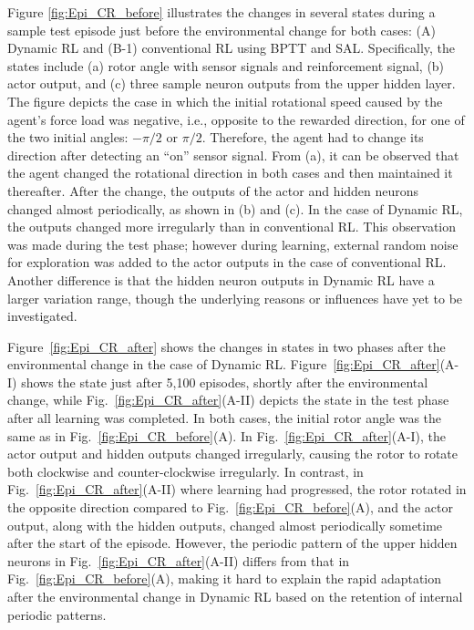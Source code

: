 Figure \ref{fig:Epi_CR_before} illustrates the changes in several states during a sample test episode just before the environmental change
for both cases: (A) Dynamic RL and (B-1) conventional RL using BPTT and SAL.
Specifically, the states include (a) rotor angle with sensor signals and reinforcement signal, (b) actor output,
and (c) three sample neuron outputs from the upper hidden layer.
The figure depicts the case in which the initial rotational speed caused by the agent's force load was negative,
i.e., opposite to the rewarded direction, for one of the two initial angles: $-\pi/2$ or $\pi/2$.
Therefore, the agent had to change its direction after detecting an ``on'' sensor signal.
From (a), it can be observed that the agent changed the rotational direction in both cases
and then maintained it thereafter.
After the change, the outputs of the actor and hidden neurons changed almost periodically, as shown in (b) and (c).
In the case of Dynamic RL, the outputs changed more irregularly than in conventional RL.
This observation was made during the test phase; however during learning,
external random noise for exploration was added
to the actor outputs in the case of conventional RL.
Another difference is that the hidden neuron outputs in Dynamic RL have a larger variation range,
though the underlying reasons or influences have yet to be investigated.


Figure~\ref{fig:Epi_CR_after} shows the changes in states in two phases after the environmental change
in the case of Dynamic RL.
Figure~\ref{fig:Epi_CR_after}(A-I) shows the state just after 5,100 episodes, shortly after the environmental change,
while Fig.~\ref{fig:Epi_CR_after}(A-II) depicts the state in the test phase after all learning was completed.
In both cases, the initial rotor angle was the same as in Fig.~\ref{fig:Epi_CR_before}(A).
In Fig.~\ref{fig:Epi_CR_after}(A-I), the actor output and hidden outputs changed irregularly, causing the rotor to rotate
both clockwise and counter-clockwise irregularly.
In contrast, in Fig.~\ref{fig:Epi_CR_after}(A-II) where learning had progressed, the rotor rotated in the opposite direction
compared to Fig.~\ref{fig:Epi_CR_before}(A), and the actor output, along with the hidden outputs, changed
almost periodically sometime after the start of the episode.
However, the periodic pattern of the upper hidden neurons in Fig.~\ref{fig:Epi_CR_after}(A-II) differs
from that in Fig.~\ref{fig:Epi_CR_before}(A),
making it hard to explain the rapid adaptation after the environmental change in Dynamic RL
based on the retention of internal periodic patterns.


